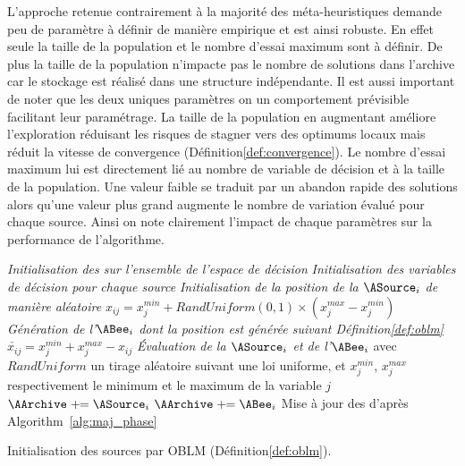 L’approche retenue contrairement à la majorité des méta-heuristiques demande
peu de paramètre à définir de manière empirique et est ainsi robuste. En effet
seule la taille de la population et le nombre d’essai maximum sont à définir.
De plus la taille de la population n’impacte pas le nombre de solutions dans l’archive
car le stockage est réalisé dans une structure indépendante. Il est aussi important
de noter que les deux uniques paramètres on un comportement prévisible facilitant
leur paramétrage. La taille de la population en augmentant améliore l’exploration
réduisant les risques de stagner vers des optimums locaux mais réduit la vitesse
de convergence (Définition\ref{def:convergence}).
Le nombre d’essai maximum lui est directement lié au nombre de variable de décision
et à la taille de la population. Une valeur faible se traduit par un abandon rapide
des solutions alors qu’une valeur plus grand augmente le nombre de variation évalué
pour chaque source. Ainsi on note clairement l’impact de chaque paramètres sur la
performance de l’algorithme.

\begin{algorithm}\label{alg:init_phase}
  \SetAlgoVlined
  \DontPrintSemicolon
  \emph{Initialisation des \ASources sur l’ensemble de l’espace de décision}\;
  {
    \emph{Initialisation des variables de décision pour chaque source}\;
    {
       \emph{Initialisation de la position de la $\ASource_{i}$ de manière aléatoire}\;
      \Indp
      $x_{ij} = x_{j}^{min} + RandUniform(0, 1) \times (x_{j}^{max} - x_{j}^{min})$\;
      \Indm
      \BlankLine
        \emph{Génération de l’$\ABee_{i}$ dont la position est générée suivant Définition\ref{def:oblm}}\;
      \Indp
      $ \check{x_{ij}} = x_{j}^{min} + x_{j}^{max} - x_{ij}$\;
      \Indm
      \BlankLine
       \emph{Évaluation de la $\ASource_{i}$ et de l’$\ABee_{i}$}\;
      \BlankLine
      avec $RandUniform$ un tirage aléatoire suivant une loi uniforme, et $x_{j}^{min}$, $x_{j}^{max}$
      respectivement le minimum et le maximum de la variable $j$\;
    }
    {
      $\AArchive \pluseq \ASource_{i}$ 
    }
    {
      $\AArchive \pluseq \ABee_{i}$ 
    }
  }
  Mise à jour des \ASources d’après Algorithm~\ref{alg:maj_phase}\;
  \caption{Initialisation des sources par OBLM (Définition\ref{def:oblm}).}
\end{algorithm}


